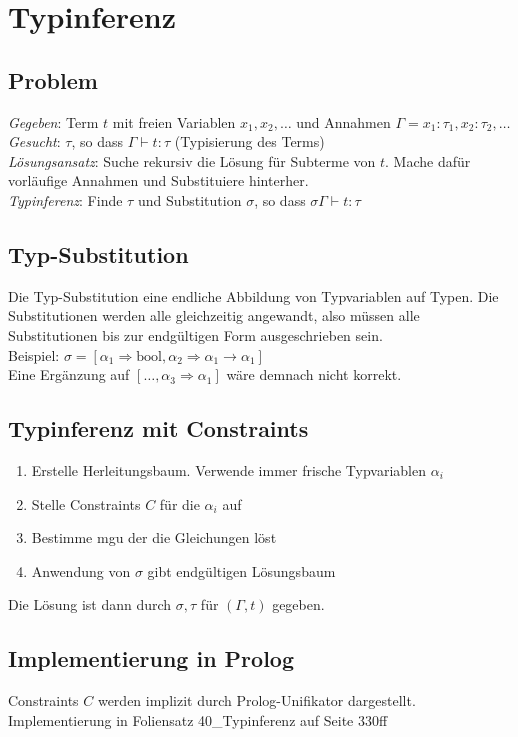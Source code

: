 

\section{Typinferenz}%
\label{inf:sec:typinferenz}

\subsection{Problem}%
\label{inf:sub:problem}
\textit{Gegeben}: Term \(t\) mit freien Variablen \(x_1, x_2, \ldots\) und Annahmen \(\Gamma = x_1 : \tau_1, x_2 : \tau_2, \ldots\)\\

\textit{Gesucht}: \(\tau\), so dass \(\Gamma \vdash t: \tau\) (Typisierung des Terms)\\

\textit{Lösungsansatz}: Suche rekursiv die Lösung für Subterme von \(t\). Mache dafür vorläufige Annahmen und Substituiere hinterher.\\

\textit{Typinferenz}: Finde \(\tau\) und Substitution \(\sigma\), so dass \(\sigma \Gamma \vdash t: \tau\)

\subsection{Typ-Substitution}%
\label{inf:sub:substitution}
Die Typ-Substitution eine endliche Abbildung von Typvariablen auf Typen. Die Substitutionen werden alle gleichzeitig angewandt, also müssen alle Substitutionen bis zur endgültigen Form
ausgeschrieben sein.\\

Beispiel: \(\sigma = [\alpha_1 \Rightarrow \text{bool}, \alpha_2 \Rightarrow \alpha_1 \rightarrow \alpha_1]\)\\
Eine Ergänzung auf \([\ldots, \alpha_3 \Rightarrow \alpha_1]\) wäre demnach nicht korrekt.

\subsection{Typinferenz mit Constraints}%
\label{inf:sub:constraints}
\begin{enumerate}
  \item Erstelle Herleitungsbaum. Verwende immer frische Typvariablen \(\alpha_i\)
  \item Stelle Constraints \(C\) für die \(\alpha_i\) auf
  \item Bestimme mgu der die Gleichungen löst
  \item Anwendung von \(\sigma\) gibt endgültigen Lösungsbaum
\end{enumerate}
Die Lösung ist dann durch \(\sigma, \tau\) für \((\Gamma, t)\) gegeben.

\subsection{Implementierung in Prolog}%
\label{inf:sub:prolog}
Constraints \(C\) werden implizit durch Prolog-Unifikator dargestellt.
Implementierung in Foliensatz 40\_Typinferenz auf Seite 330ff